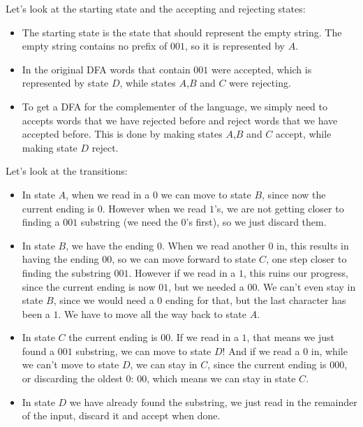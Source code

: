 Let's look at the starting state and the accepting and rejecting states:

\begin{itemize}
    \item The starting state is the state that should represent the empty string. The empty string contains no prefix of $001$, so it is represented by $A$.
    \item In the original DFA words that contain $001$ were accepted, which is represented by state $D$, while states $A$,$B$ and $C$ were rejecting.
    \item To get a DFA for the complementer of the language, we simply need to accepts words that we have rejected before and reject words that we have accepted before. This is done by making states $A$,$B$ and $C$ accept, while making state $D$ reject.
\end{itemize}

Let's look at the transitions:

\begin{itemize}
    \item In state $A$, when we read in a $0$ we can move to state $B$, since now the current ending is $0$. However when we read $1$'s, we are not getting closer to finding a $001$ substring (we need the $0$'s first), so we just discard them.
    \item In state $B$, we have the ending $0$. When we read another $0$ in, this results in having the ending $00$, so we can move forward to state $C$, one step closer to finding the substring $001$. However if we read in a $1$, this ruins our progress, since the current ending is now $01$, but we needed a $00$. We can't even stay in state $B$, since we would need a $0$ ending for that, but the last character has been a $1$. We have to move all the way back to state $A$.
    \item In state $C$ the current ending is $00$. If we read in a $1$, that means we just found a $001$ substring, we can move to state $D$! And if we read a $0$ in, while we can't move to state $D$, we can stay in $C$, since the current ending is $000$, or discarding the oldest $0$: $00$, which means we can stay in state $C$.
    \item In state $D$ we have already found the substring, we just read in the remainder of the input, discard it and accept when done.
\end{itemize}